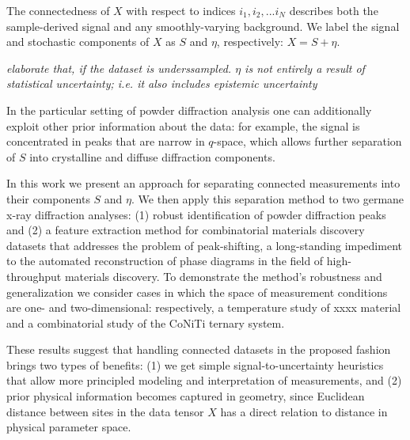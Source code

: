 \documentclass[12pt]{iopart}
\begin{document}
%

The connectedness of $X$ with respect to indices $i_1, i_2, ... i_N$ describes both the sample-derived signal and any smoothly-varying
background. We label the signal and stochastic components of $X$ as $S$ and $\eta$, respectively: $X = S + \eta$.
 

\emph{elaborate that, if the dataset is underssampled. $\eta$ is not entirely a result of statistical uncertainty; i.e. it also includes epistemic uncertainty}

In the particular setting of powder diffraction analysis one can additionally exploit other prior information about the data: for example, the signal is concentrated in peaks that are narrow in $q$-space, which allows further separation of $S$ into crystalline and diffuse diffraction components.


In this work we present an approach for separating connected
measurements into their components $S$ and $\eta$. We then apply this
separation method to two germane x-ray diffraction analyses: (1) robust
identification of powder diffraction peaks and (2) a feature extraction
method for combinatorial materials discovery datasets that addresses the
problem of peak-shifting, a long-standing impediment to the automated
reconstruction of phase diagrams in the field of high-throughput
materials discovery. To demonstrate the method's robustness and generalization we
consider cases in which the space of measurement conditions are one- and
two-dimensional: respectively, a temperature study of xxxx material and
a combinatorial study of the CoNiTi ternary system.

These results suggest that handling connected datasets in the proposed fashion
brings two types of benefits: (1) we get simple signal-to-uncertainty
heuristics that allow more principled modeling and interpretation of
measurements, and (2) prior physical information becomes captured in
geometry, since Euclidean distance between sites in the data tensor $X$
has a direct relation to distance in physical parameter space.
\end{document}
